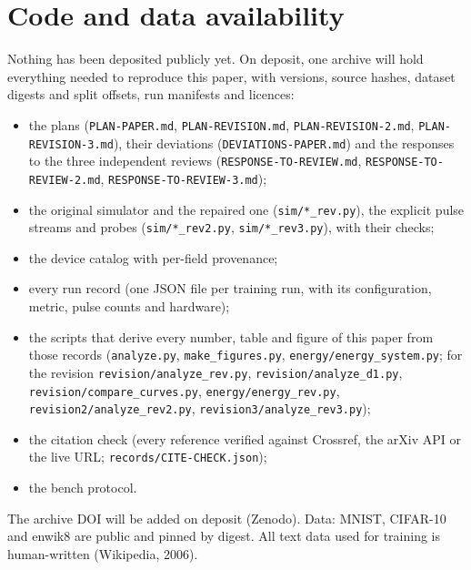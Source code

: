 








\section{Code and data availability}\label{sec:availability}
\begin{sloppypar}
Nothing has been deposited publicly yet. On deposit, one archive will hold everything needed to reproduce this paper, with
versions, source hashes, dataset digests and split offsets, run manifests and licences:
\begin{itemize}
\item the plans (\texttt{PLAN-PAPER.md}, \texttt{PLAN-REVISION.md}, \texttt{PLAN-REVISION-2.md},
      \texttt{PLAN-REVISION-3.md}), their deviations (\texttt{DEVIATIONS-PAPER.md}) and the responses to the three
      independent reviews (\texttt{RESPONSE-TO-REVIEW.md}, \texttt{RESPONSE-TO-REVIEW-2.md},
      \texttt{RESPONSE-TO-REVIEW-3.md});
\item the original simulator and the repaired one (\texttt{sim/*\_rev.py}), the explicit pulse streams and probes
      (\texttt{sim/*\_rev2.py}, \texttt{sim/*\_rev3.py}), with their checks;
\item the device catalog with per-field provenance;
\item every run record (one JSON file per training run, with its configuration, metric, pulse counts and hardware);
\item the scripts that derive every number, table and figure of this paper from those records (\texttt{analyze.py},
      \texttt{make\_figures.py}, \texttt{energy/energy\_system.py}; for the revision \texttt{revision/analyze\_rev.py},
      \texttt{revision/analyze\_d1.py}, \texttt{revision/compare\_curves.py}, \texttt{energy/energy\_rev.py},
      \texttt{revision2/analyze\_rev2.py}, \texttt{revision3/analyze\_rev3.py});
\item the citation check (every reference verified against Crossref, the arXiv API or the live URL;
      \texttt{records/CITE-CHECK.json});
\item the bench protocol.
\end{itemize}
The archive DOI will be added on deposit (Zenodo). Data: MNIST, CIFAR-10 and enwik8 are public and pinned by digest. All text
data used for training is human-written (Wikipedia, 2006).

\end{sloppypar}

